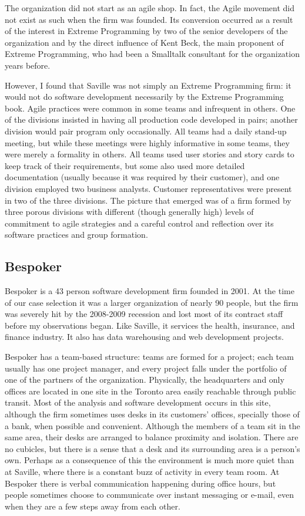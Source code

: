 The organization did not start as an agile shop. In fact, the Agile movement did not exist as such when the firm was founded. Its conversion occurred as a result of the interest in Extreme Programming by two of the senior developers of the organization and by the direct influence of Kent Beck, the main proponent of Extreme Programming, who had been a Smalltalk consultant for the organization years before.

However, I found that Saville was not simply an Extreme Programming firm: it would not do software development necessarily by the Extreme Programming book. Agile practices were common in some teams and infrequent in others. One of the divisions insisted in having all production code developed in pairs; another division would pair program only occasionally. All teams had a daily stand-up meeting, but while these meetings were highly informative in some teams, they were merely a formality in others. All teams used user stories and story cards to keep track of their requirements, but some also used more detailed documentation (usually because it was required by their customer), and one division employed two business analysts. Customer representatives were present in two of the three divisions. The picture that emerged was of a firm formed by three porous divisions with different (though generally high) levels of commitment to agile strategies and a careful control and reflection over its software practices and group formation.



\subsection{Bespoker}

Bespoker is a 43 person software development firm founded in 2001. At the time of our case selection it was a larger organization of nearly 90 people, but the firm was severely hit by the 2008-2009 recession and lost most of its contract staff before my observations began. Like Saville, it services the health, insurance, and finance industry. It also has data warehousing and web development projects.

Bespoker has a team-based structure: teams are formed for a project; each team usually has one project manager, and every project falls under the portfolio of one of the partners of the organization. Physically, the headquarters and only offices are located in one site in the Toronto area easily reachable through public transit. Most of the analysis and software development occurs in this site, although the firm sometimes uses desks in its customers' offices, specially those of a bank, when possible and convenient. Although the members of a team sit in the same area, their desks are arranged to balance proximity and isolation. There are no cubicles, but there is a sense that a desk and its surrounding area is a person's own. Perhaps as a consequence of this the environment is much more quiet than at Saville, where there is a constant buzz of activity in every team room. At Bespoker there is verbal communication happening during office hours, but people sometimes choose to communicate over instant messaging or e-mail, even when they are a few steps away from each other.

